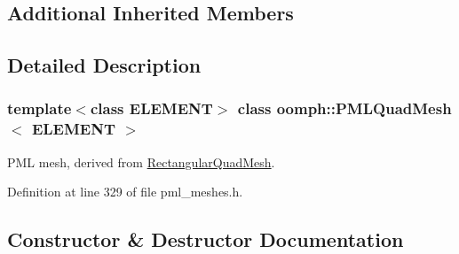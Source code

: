 \subsection*{Additional Inherited Members}


\subsection{Detailed Description}
\subsubsection*{template$<$class E\+L\+E\+M\+E\+NT$>$\newline
class oomph\+::\+P\+M\+L\+Quad\+Mesh$<$ E\+L\+E\+M\+E\+N\+T $>$}

P\+ML mesh, derived from \hyperlink{classoomph_1_1RectangularQuadMesh}{Rectangular\+Quad\+Mesh}. 

Definition at line 329 of file pml\+\_\+meshes.\+h.



\subsection{Constructor \& Destructor Documentation}
\mbox{\label{classoomph_1_1PMLQuadMesh_a7559d700361ed44823a7b2f4be17e6ea}} 
